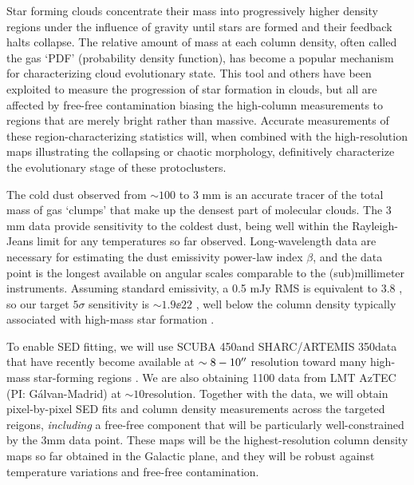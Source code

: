 Star forming clouds concentrate their mass into progressively higher density
regions under the influence of gravity until stars are formed and their
feedback halts collapse.  The relative amount of mass at each column density,
often called the gas `PDF' (probability density function), has become a popular
mechanism for characterizing cloud evolutionary state.  This tool and others
\citep[e.g., column autocorrelation functions,][]{Lin2016a}  have been exploited
to measure the progression of star formation in clouds, but all are affected by
free-free contamination biasing the high-column measurements to regions that
are merely bright rather than massive.  Accurate measurements of these
region-characterizing statistics will, when combined with the high-resolution
maps illustrating the collapsing or chaotic morphology, definitively
characterize the evolutionary stage of these protoclusters.


The cold dust observed from $\sim100$ \um to 3 mm is an accurate tracer of
the total mass of gas `clumps' that make up the densest part of molecular clouds.
The 3 mm data provide sensitivity to the coldest dust, being well within the
Rayleigh-Jeans limit for any temperatures so far observed.
Long-wavelength data are necessary for estimating the dust emissivity power-law
index $\beta$, and the \MUSTANG 3mm data point is the longest available on
angular scales comparable to the (sub)millimeter instruments.
Assuming standard emissivity, a 0.5 mJy RMS is equivalent to 3.8
\persc, so our target $5\sigma$ sensitivity is $\sim1.9\ee{22}$ \persc, well
below the column density typically associated with high-mass star formation
\citep[e.g.,][]{Krumholz2008a}.

To enable SED fitting, we will use SCUBA 450\um and SHARC/ARTEMIS 350\um data
that have recently become available at $\sim8-10\mbox{$^{\prime\prime}$}$ resolution toward many
high-mass star-forming regions \citep{Lin2016a}.  We are also obtaining 1100\um
data from LMT AzTEC  (PI: G{\'a}lvan-Madrid) at $\sim10$\arcsec resolution.
Together with the \MUSTANG data, we will obtain pixel-by-pixel SED fits and
column density measurements across the targeted reigons, \emph{including} a
free-free component that will be particularly well-constrained by the 3mm data
point.  These maps will be the highest-resolution column density maps so far
obtained in the Galactic plane, and they will be robust against temperature
variations and free-free contamination.

